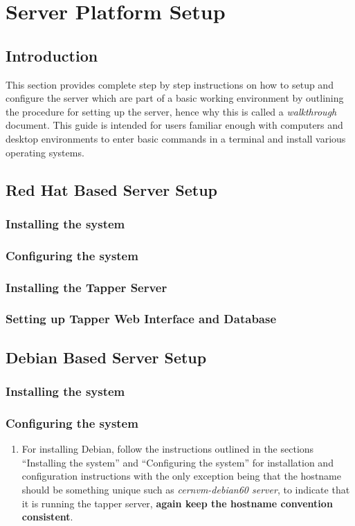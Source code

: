 \chapter{\cernvmreleasetesting Server Platform Setup}
\label{sct:serversetup}

\section{Introduction}
This section provides complete step by step instructions on how to setup and configure the \tapper server which are part of a basic working
\releasetesting environment by outlining the procedure for setting up the server, hence why this is called a \emph{walkthrough} document. 
This guide is intended for users familiar enough with computers and desktop environments to enter basic commands in a terminal and install 
various operating systems. 

\section{Red Hat Based Server Setup}
\subsection{Installing the system}
\subsection{Configuring the system}
\subsection{Installing the Tapper Server}
\subsection{Setting up Tapper Web Interface and Database}

\section{Debian Based Server Setup}
\subsection{Installing the system}
\subsection{Configuring the system}
\flushleft
\begin{enumerate}
\item For installing Debian, follow the instructions outlined in the sections ``Installing the system'' and ``Configuring the system'' 
for installation and configuration instructions with the only exception being that the hostname should be something unique such as 
\emph{cernvm-debian60 server}, to indicate that it is running the tapper server, {\bf again keep the hostname convention consistent}.
\end{enumerate}

